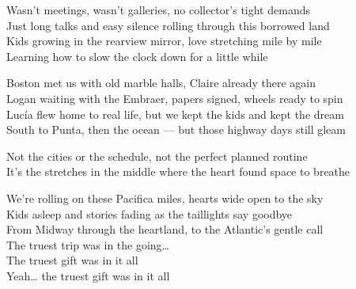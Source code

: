 \begin{lyrics}
Wasn’t meetings, wasn’t galleries, no collector’s tight demands\\
Just long talks and easy silence rolling through this borrowed land\\
Kids growing in the rearview mirror, love stretching mile by mile\\
Learning how to slow the clock down for a little while

Boston met us with old marble halls, Claire already there again\\
Logan waiting with the Embraer, papers signed, wheels ready to spin\\
Lucía flew home to real life, but we kept the kids and kept the dream\\
South to Punta, then the ocean — but those highway days still gleam

Not the cities or the schedule, not the perfect planned routine\\
It’s the stretches in the middle where the heart found space to breathe

We’re rolling on these Pacifica miles, hearts wide open to the sky\\
Kids asleep and stories fading as the taillights say goodbye\\
From Midway through the heartland, to the Atlantic’s gentle call\\
The truest trip was in the going…\\
The truest gift was in it all\\
Yeah… the truest gift was in it all

\end{lyrics}

